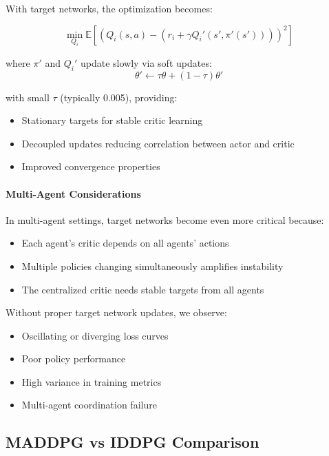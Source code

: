 \documentclass[conference]{IEEEtran}
\begin{document}
{{With target networks, the optimization becomes:

\begin{equation}
\min_{Q_i} \mathbb{E}[(Q_i(s,a) - (r_i + \gamma Q_i'(s', \pi'(s'))))^2]
\end{equation}

where $\pi'$ and $Q_i'$ update slowly via soft updates:
\begin{equation}
\theta' \leftarrow \tau\theta + (1-\tau)\theta'
\end{equation}

with small $\tau$ (typically 0.005), providing:
\begin{itemize}
    \item Stationary targets for stable critic learning
    \item Decoupled updates reducing correlation between actor and critic
    \item Improved convergence properties
\end{itemize}

\paragraph{Multi-Agent Considerations}

In multi-agent settings, target networks become even more critical because:
\begin{itemize}
    \item Each agent's critic depends on all agents' actions
    \item Multiple policies changing simultaneously amplifies instability
    \item The centralized critic needs stable targets from all agents
\end{itemize}

Without proper target network updates, we observe:
\begin{itemize}
    \item Oscillating or diverging loss curves
    \item Poor policy performance
    \item High variance in training metrics
    \item Multi-agent coordination failure
\end{itemize}

\subsection{MADDPG vs IDDPG Comparison}

}}
\end{document}
